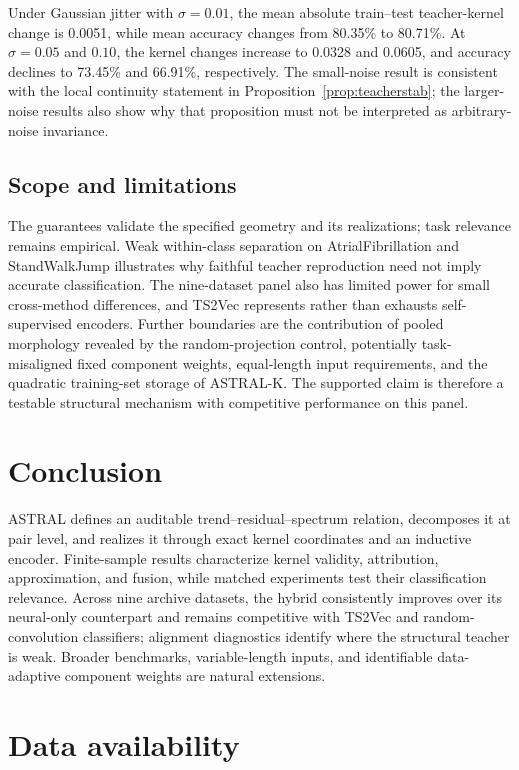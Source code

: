 \documentclass[pdflatex,sn-mathphys-num]{sn-jnl}
\newcommand{\1}{\mathbf{1}}
\theoremstyle{plain}
\begin{document}
	Under Gaussian jitter with $\sigma=0.01$, the mean absolute train--test teacher-kernel change is 0.0051, while mean accuracy changes from 80.35\% to 80.71\%. At $\sigma=0.05$ and $0.10$, the kernel changes increase to 0.0328 and 0.0605, and accuracy declines to 73.45\% and 66.91\%, respectively. The small-noise result is consistent with the local continuity statement in Proposition~\ref{prop:teacherstab}; the larger-noise results also show why that proposition must not be interpreted as arbitrary-noise invariance.
	
	\subsection{Scope and limitations}
	
	The guarantees validate the specified geometry and its realizations; task relevance remains empirical. Weak within-class separation on AtrialFibrillation and StandWalkJump illustrates why faithful teacher reproduction need not imply accurate classification. The nine-dataset panel also has limited power for small cross-method differences, and TS2Vec represents rather than exhausts self-supervised encoders. Further boundaries are the contribution of pooled morphology revealed by the random-projection control, potentially task-misaligned fixed component weights, equal-length input requirements, and the quadratic training-set storage of ASTRAL-K. The supported claim is therefore a testable structural mechanism with competitive performance on this panel.

	\section{Conclusion}
	
	ASTRAL defines an auditable trend--residual--spectrum relation, decomposes it at pair level, and realizes it through exact kernel coordinates and an inductive encoder. Finite-sample results characterize kernel validity, attribution, approximation, and fusion, while matched experiments test their classification relevance. Across nine archive datasets, the hybrid consistently improves over its neural-only counterpart and remains competitive with TS2Vec and random-convolution classifiers; alignment diagnostics identify where the structural teacher is weak. Broader benchmarks, variable-length inputs, and identifiable data-adaptive component weights are natural extensions.

\backmatter

\section*{Data availability}
\end{document}
